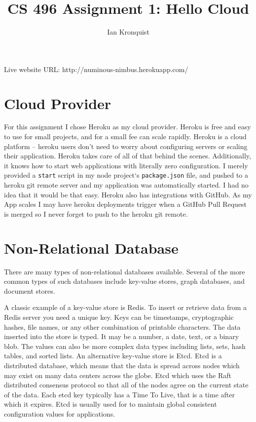 \documentclass[12pt]{article}
\title{CS 496 Assignment 1: Hello Cloud}
\author{Ian Kronquist}
\begin{document}
\maketitle

Live website URL: http://numinous-nimbus.herokuapp.com/

\section{Cloud Provider}
For this assignment I chose Heroku as my cloud provider. Heroku is free and easy to use for small projects, and for a small fee can scale rapidly. Heroku is a cloud platform -- heroku users don't need to worry about configuring servers or scaling their application. Heroku takes care of all of that behind the scenes. Additionally, it knows how to start web applications with literally zero configuration. I merely provided a \texttt{start} script in my node project`s \texttt{package.json} file, and pushed to a heroku git remote server and my application was automatically started. I had no idea that it would be that easy. Heroku also has integrations with GitHub. As my App scales I may have heroku deployments trigger when a GitHub Pull Request is merged so I never forget to push to the heroku git remote.

\section{Non-Relational Database}
There are many types of non-relational databases available. Several of the more common types of such databases include key-value stores, graph databases, and document stores.

A classic example of a key-value store is Redis. To insert or retrieve data from a Redis server you need a unique key. Keys can be timestamps, cryptographic hashes, file names, or any other combination of printable characters. The data inserted into the store is typed. It may be a number, a date, text, or a binary blob. The values can also be more complex data types including lists, sets, hash tables, and sorted lists. An alternative key-value store is Etcd. Etcd is a distributed database, which means that the data is spread across nodes which may exist on many data centers across the globe. Etcd which uses the Raft distributed consensus protocol so that all of the nodes agree on the current state of the data. Each etcd key typically has a Time To Live, that is a time after which it expires. Etcd is usually used for to maintain global consistent configuration values for applications.
\end{document}
